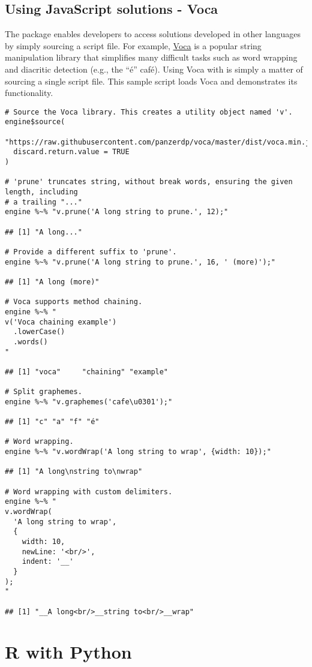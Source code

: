 \subsection{Using JavaScript solutions - Voca}

The  package enables developers to access solutions developed in other languages by simply sourcing a script file. For example, \href{https://vocajs.com/}{Voca} is a popular string manipulation library that simplifies many difficult tasks such as word wrapping and diacritic detection (e.g., the “\'{e}” caf\'{e}). Using Voca with  is simply a matter of sourcing a single script file. This sample script loads Voca and demonstrates its functionality.

\begin{verbatim}
# Source the Voca library. This creates a utility object named 'v'.
engine$source(
  "https://raw.githubusercontent.com/panzerdp/voca/master/dist/voca.min.js",
  discard.return.value = TRUE
)

# 'prune' truncates string, without break words, ensuring the given length, including
# a trailing "..."
engine %~% "v.prune('A long string to prune.', 12);"

## [1] "A long..."

# Provide a different suffix to 'prune'.
engine %~% "v.prune('A long string to prune.', 16, ' (more)');"

## [1] "A long (more)"

# Voca supports method chaining.
engine %~% "
v('Voca chaining example')
  .lowerCase()
  .words()
"

## [1] "voca"     "chaining" "example"

# Split graphemes.
engine %~% "v.graphemes('cafe\u0301');"

## [1] "c" "a" "f" "é"

# Word wrapping.
engine %~% "v.wordWrap('A long string to wrap', {width: 10});"

## [1] "A long\nstring to\nwrap"

# Word wrapping with custom delimiters.
engine %~% "
v.wordWrap(
  'A long string to wrap',
  {
    width: 10,
    newLine: '<br/>',
    indent: '__'
  }
);
"

## [1] "__A long<br/>__string to<br/>__wrap"
\end{verbatim}

\hypertarget{rwithpython}{\section{R with Python}}

